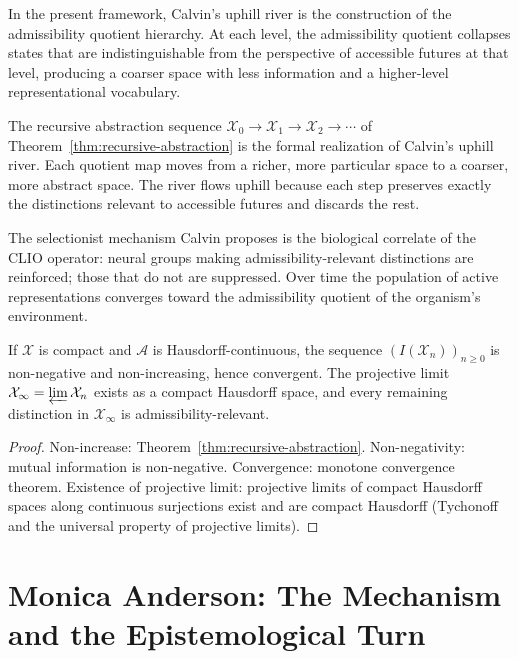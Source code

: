 \documentclass[12pt, a4paper, oneside]{book}
\newcommand{\Adm}{\mathcal{A}}
\newcommand{\X}{\mathcal{X}}
\begin{document}
In the present framework, Calvin's uphill river is the construction of
the admissibility quotient hierarchy. At each level, the admissibility
quotient collapses states that are indistinguishable from the perspective
of accessible futures at that level, producing a coarser space with less
information and a higher-level representational vocabulary.

\begin{proposition}
\label{prop:calvin-river}
The recursive abstraction sequence $\X_0 \to \X_1 \to \X_2 \to \cdots$
of Theorem~\ref{thm:recursive-abstraction} is the formal realization of
Calvin's uphill river. Each quotient map moves from a richer, more
particular space to a coarser, more abstract space. The river flows
uphill because each step preserves exactly the distinctions relevant to
accessible futures and discards the rest.
\end{proposition}

The selectionist mechanism Calvin proposes is the biological correlate
of the CLIO operator: neural groups making admissibility-relevant
distinctions are reinforced; those that do not are suppressed. Over time
the population of active representations converges toward the
admissibility quotient of the organism's environment.

\begin{proposition}
\label{prop:stabilization}
If $\X$ is compact and $\Adm$ is Hausdorff-continuous, the sequence
$(I(\X_n))_{n \geq 0}$ is non-negative and non-increasing, hence
convergent. The projective limit $\X_\infty = \varprojlim \X_n$ exists
as a compact Hausdorff space, and every remaining distinction in
$\X_\infty$ is admissibility-relevant.
\end{proposition}

\begin{proof}
Non-increase: Theorem~\ref{thm:recursive-abstraction}.
Non-negativity: mutual information is non-negative.
Convergence: monotone convergence theorem.
Existence of projective limit: projective limits of compact Hausdorff
spaces along continuous surjections exist and are compact Hausdorff
(Tychonoff and the universal property of projective limits).
\end{proof}

\section{Monica Anderson: The Mechanism and the Epistemological Turn}
\end{document}
